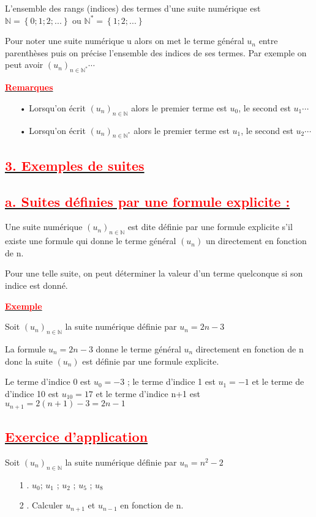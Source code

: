 \documentclass[12pt]{article}
\begin{document}
L’ensemble des rangs (indices) des termes d’une suite numérique est\\
$\mathbb{N}=\left\lbrace 0 ; 1 ; 2 ; ... \right\rbrace$ ou $\mathbb{N}^{*}=\left\lbrace 1 ; 2 ; ... \right\rbrace $

Pour noter une suite numérique u alors on met le terme général $u_{n}$ entre parenthèses puis on précise
l’ensemble des indices de ses termes. Par exemple on peut avoir $(u_{n})_{n\in\mathbb{N}^{*}}\cdots$ 

\underline{\textbf{\textcolor{red}{Remarques}}}
\begin{itemize}
\item[•] Lorsqu’on écrit $(u_{n})_{n\in\mathbb{N}}$ alors le premier terme est $u_{0}$, le second est $u_{1}\cdots$
\item[•] Lorsqu’on écrit $(u_{n})_{n\in\mathbb{N}^{*}}$ alors le premier terme est $u_{1}$, le second est $u_{2}\cdots$
\end{itemize}
\subsection*{\underline{\textbf{\textcolor{red}{3. Exemples de suites}}}}
\subsection*{\underline{\textbf{\textcolor{red}{a. Suites définies par une formule explicite :}}}}
Une suite numérique $(u_{n})_{n\in\mathbb{N}}$ est dite définie par une formule explicite s’il existe une formule qui donne le terme général $(u_{n})$ un directement en fonction de n.

Pour une telle suite, on peut déterminer la valeur d’un terme quelconque si son indice est donné.

\underline{\textbf{\textcolor{red}{Exemple}}}

Soit $(u_{n})_{n\in\mathbb{N}}$ la suite numérique définie par $u_{n}=2n-3$

La formule $u_{n}=2n-3$ donne le terme général $u_{n}$ directement en fonction de n donc la suite $(u_{n})$ est définie par une formule explicite.

Le terme d’indice 0 est $u_{0}=-3$ ; le terme d’indice 1 est $u_{1}=-1$ et le terme de d’indice 10 est $u_{10}=17$ et le terme d’indice n+1 est\\ $u_{n+1}=2(n+1)-3=2n-1$
\subsection*{\underline{\textbf{\textcolor{red}{Exercice d'application}}}}
Soit $(u_{n})_{n\in\mathbb{N}}$ la suite numérique définie par $u_{n}=n^{2}-2$
\begin{itemize}
\item[1]. $u_{0}$; $u_{1}$ ; $u_{2}$ ; $u_{5}$ ; $u_{8}$
\item[2]. Calculer $u_{n+1}$ et $u_{n-1}$ en fonction de n.
\end{itemize}
\end{document}

